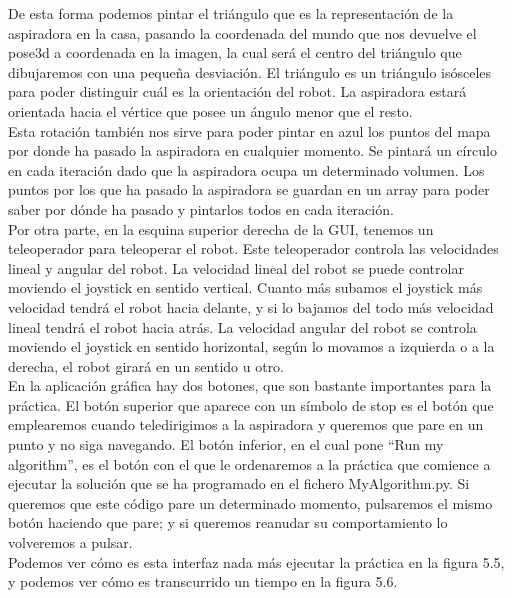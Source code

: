 De esta forma podemos pintar el triángulo que es la representación de la aspiradora en la casa, pasando la coordenada del mundo que nos devuelve el pose3d a coordenada en la imagen, la cual será el centro del triángulo que dibujaremos con una pequeña desviación. El triángulo es un triángulo isósceles para poder distinguir cuál es la orientación del robot. La aspiradora estará orientada hacia el vértice que posee un ángulo menor que el resto.\\

Esta rotación también nos sirve para poder pintar en azul los puntos del mapa por donde ha pasado la aspiradora en cualquier momento. Se pintará un círculo en cada iteración dado que la aspiradora ocupa un determinado volumen. Los puntos por los que ha pasado la aspiradora se guardan en un array para poder saber por dónde ha pasado y pintarlos todos en cada iteración.\\

Por otra parte, en la esquina superior derecha de la GUI, tenemos un teleoperador para teleoperar el robot. Este teleoperador controla las velocidades lineal y angular del robot. La velocidad lineal del robot se puede controlar moviendo el joystick en sentido vertical. Cuanto más subamos el joystick más velocidad tendrá el robot hacia delante, y si lo bajamos del todo más velocidad lineal tendrá el robot hacia atrás. La velocidad angular del robot se controla moviendo el joystick en sentido horizontal, según lo movamos a izquierda o a la derecha, el robot girará en un sentido u otro.\\

En la aplicación gráfica hay dos botones, que son bastante importantes para la práctica. El botón superior que aparece con un símbolo de stop es el botón que emplearemos cuando teledirigimos a la aspiradora y queremos que pare en un punto y no siga navegando. El botón inferior, en el cual pone ``Run my algorithm'', es el botón con el que le ordenaremos a la práctica que comience a ejecutar la solución que se ha programado en el fichero MyAlgorithm.py. Si queremos que este código pare un determinado momento, pulsaremos el mismo botón haciendo que pare; y si queremos reanudar su comportamiento lo volveremos a pulsar.\\

Podemos ver cómo es esta interfaz nada más ejecutar la práctica en la figura 5.5, y podemos ver cómo es transcurrido un tiempo en la figura 5.6.\\

